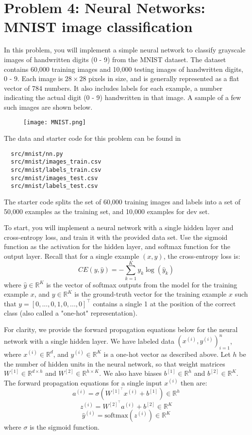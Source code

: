 \documentclass{article}
\begin{document}

\section*{Problem 4: Neural Networks: MNIST image classification}

In this problem, you will implement a simple neural network to classify grayscale images of handwritten digits (0 - 9) from the MNIST dataset. The dataset contains 60,000 training images and 10,000 testing images of handwritten digits, 0 - 9. Each image is $28\times28$ pixels in size, and is generally represented as a flat vector of 784 numbers. It also includes labels for each example, a number indicating the actual digit (0 - 9) handwritten in that image. A sample of a few such images are shown below.

\begin{figure}[H]
    \centering
\texttt{[image: MNIST.png]}
\end{figure}


The data and starter code for this problem can be found in
\begin{verbatim}
  src/mnist/nn.py
  src/mnist/images_train.csv
  src/mnist/labels_train.csv
  src/mnist/images_test.csv
  src/mnist/labels_test.csv
\end{verbatim}

The starter code splits the set of 60,000 training images and labels into a set of 50,000 examples as the training set, and 10,000 examples for dev set.

To start, you will implement a neural network with a single hidden layer and cross-entropy loss, and train it with the provided data set. Use the sigmoid function as the activation for the hidden layer, and softmax function for the output layer. Recall that for a single example $(x, y)$, the cross-entropy loss is:
\[
CE(y,\hat{y})= -\sum_{k=1}^{K} y_k \log(\hat{y}_k) 
\]
where $\hat{y} \in \mathbb{R}^K$ is the vector of softmax outputs from the model for the training example $x$, and $y \in \mathbb{R}^K$ is the ground-truth vector for the training example $x$ such that $y=[0,...,0,1,0,...,0]^{\top}$ contains a single 1 at the position of the correct class (also called a "one-hot" representation).

For clarity, we provide the forward propagation equations below for the neural network with a single hidden layer. We have labeled data $(x^{(i)},y^{(i)})_{i=1}^n$, where $x^{(i)} \in \mathbb{R}^d$, and $y^{(i)} \in \mathbb{R}^K$ is a one-hot vector as described above. Let $h$ be the number of hidden units in the neural network, so that weight matrices $W^{[1]} \in \mathbb{R}^{d \times h}$ and $W^{[2]} \in \mathbb{R}^{h \times K}$. We also have biases $b^{[1]} \in \mathbb{R}^h$ and $b^{[2]} \in \mathbb{R}^K$. The forward propagation equations for a single input $x^{(i)}$ then are:
\[ a^{(i)} = \sigma\left(W^{[1]^\top} x^{(i)} + b^{[1]}\right) \in \mathbb{R}^h \]
\[ z^{(i)} = W^{[2]^\top} a^{(i)} + b^{[2]} \in \mathbb{R}^K \]
\[ \hat{y}^{(i)} = \text{softmax}(z^{(i)}) \in \mathbb{R}^K \]
where $\sigma$ is the sigmoid function.
\end{document}
